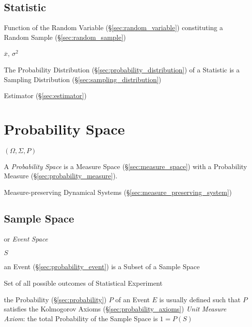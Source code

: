\subsection{Statistic}\label{sec:statistic}

Function of the Random Variable (\S\ref{sec:random_variable})
constituting a Random Sample (\S\ref{sec:random_sample})

$\overline{x}$, $\sigma^2$

The Probability Distribution (\S\ref{sec:probability_distribution}) of
a Statistic is a Sampling Distribution
(\S\ref{sec:sampling_distribution})

Estimator (\S\ref{sec:estimator})



\section{Probability Space}\label{sec:probability_space}

$(\Omega, \Sigma, P)$

A \emph{Probability Space} is a Measure Space
(\S\ref{sec:measure_space}) with a Probability Measure
(\S\ref{sec:probability_measure}).

\fist Measure-preserving Dynamical Systems
(\S\ref{sec:measure_preserving_system})



\subsection{Sample Space}\label{sec:sample_space}

or \emph{Event Space}

$S$

an Event (\S\ref{sec:probability_event}) is a Subset of a Sample Space

Set of all possible outcomes of Statistical Experiment

the Probability (\S\ref{sec:probability}) $P$ of an Event $E$ is usually
defined such that $P$ satisfies the Kolmogorov Axioms
(\S\ref{sec:probability_axioms}) \fist \emph{Unit Measure Axiom}: the
total Probability of the Sample Space is $1 = P(S)$

